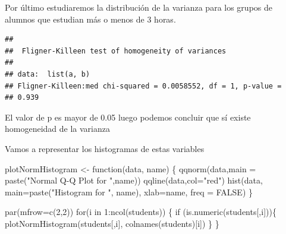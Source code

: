 \documentclass[]{article}
\newenvironment{Shaded}{\begin{snugshade}}{\end{snugshade}}
\newcommand{\ControlFlowTok}[1]{\textcolor[rgb]{0.94,0.87,0.69}{#1}}
\newcommand{\DataTypeTok}[1]{\textcolor[rgb]{0.87,0.87,0.75}{#1}}
\newcommand{\DecValTok}[1]{\textcolor[rgb]{0.86,0.86,0.80}{#1}}
\newcommand{\KeywordTok}[1]{\textcolor[rgb]{0.94,0.87,0.69}{#1}}
\newcommand{\NormalTok}[1]{\textcolor[rgb]{0.80,0.80,0.80}{#1}}
\newcommand{\OperatorTok}[1]{\textcolor[rgb]{0.94,0.94,0.82}{#1}}
\newcommand{\OtherTok}[1]{\textcolor[rgb]{0.94,0.94,0.56}{#1}}
\newcommand{\StringTok}[1]{\textcolor[rgb]{0.80,0.58,0.58}{#1}}
\begin{document}
Por último estudiaremos la distribución de la varianza para los grupos
de alumnos que estudian más o menos de 3 horas.

\begin{Shaded}
\end{Shaded}

\begin{verbatim}
## 
##  Fligner-Killeen test of homogeneity of variances
## 
## data:  list(a, b)
## Fligner-Killeen:med chi-squared = 0.0058552, df = 1, p-value =
## 0.939
\end{verbatim}

El valor de p es mayor de 0.05 luego podemos concluir que sí existe
homogeneidad de la varianza

Vamos a representar los histogramas de estas variables

\begin{Shaded}
\begin{Highlighting}[]
\NormalTok{plotNormHistogram <-}\StringTok{ }\ControlFlowTok{function}\NormalTok{(data, name) \{}
    \KeywordTok{qqnorm}\NormalTok{(data,}\DataTypeTok{main =} \KeywordTok{paste}\NormalTok{(}\StringTok{"Normal Q-Q Plot for "}\NormalTok{,name))}
    \KeywordTok{qqline}\NormalTok{(data,}\DataTypeTok{col=}\StringTok{"red"}\NormalTok{)}
    \KeywordTok{hist}\NormalTok{(data, }
      \DataTypeTok{main=}\KeywordTok{paste}\NormalTok{(}\StringTok{"Histogram for "}\NormalTok{, name), }
      \DataTypeTok{xlab=}\NormalTok{name, }\DataTypeTok{freq =} \OtherTok{FALSE}\NormalTok{)}
\NormalTok{\}}
\end{Highlighting}
\end{Shaded}

\begin{Shaded}
\begin{Highlighting}[]
\KeywordTok{par}\NormalTok{(}\DataTypeTok{mfrow=}\KeywordTok{c}\NormalTok{(}\DecValTok{2}\NormalTok{,}\DecValTok{2}\NormalTok{))}
\ControlFlowTok{for}\NormalTok{(i }\ControlFlowTok{in} \DecValTok{1}\OperatorTok{:}\KeywordTok{ncol}\NormalTok{(students)) \{}
  \ControlFlowTok{if}\NormalTok{ (}\KeywordTok{is.numeric}\NormalTok{(students[,i]))\{}
    \KeywordTok{plotNormHistogram}\NormalTok{(students[,i], }\KeywordTok{colnames}\NormalTok{(students)[i])}
\NormalTok{  \}}
\NormalTok{\}}
\end{Highlighting}
\end{Shaded}
\end{document}
